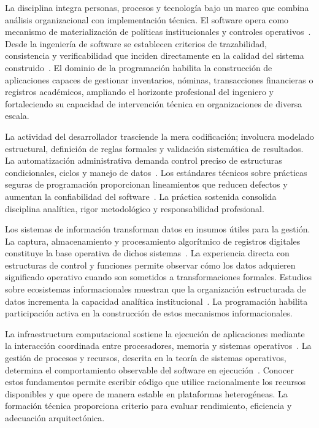 \documentclass[12pt,twoside]{book}
\begin{document}
			La disciplina integra personas, procesos y tecnología bajo un marco que combina análisis organizacional con implementación técnica. El software opera como mecanismo de materialización de políticas institucionales y controles operativos~\cite{Gonzalez-Longatt2007Introduccion}. Desde la ingeniería de software se establecen criterios de trazabilidad, consistencia y verificabilidad que inciden directamente en la calidad del sistema construido~\cite{Ghezzi2003Fundamentals}. El dominio de la programación habilita la construcción de aplicaciones capaces de gestionar inventarios, nóminas, transacciones financieras o registros académicos, ampliando el horizonte profesional del ingeniero y fortaleciendo su capacidad de intervención técnica en organizaciones de diversa escala.
			
			La actividad del desarrollador trasciende la mera codificación; involucra modelado estructural, definición de reglas formales y validación sistemática de resultados. La automatización administrativa demanda control preciso de estructuras condicionales, ciclos y manejo de datos~\cite{Hanly2015Problem}. Los estándares técnicos sobre prácticas seguras de programación proporcionan lineamientos que reducen defectos y aumentan la confiabilidad del software~\cite{ISO247722024Programming}. La práctica sostenida consolida disciplina analítica, rigor metodológico y responsabilidad profesional.
			
			Los sistemas de información transforman datos en insumos útiles para la gestión. La captura, almacenamiento y procesamiento algorítmico de registros digitales constituye la base operativa de dichos sistemas~\cite{Gaddis2022Starting}. La experiencia directa con estructuras de control y funciones permite observar cómo los datos adquieren significado operativo cuando son sometidos a transformaciones formales. Estudios sobre ecosistemas informacionales muestran que la organización estructurada de datos incrementa la capacidad analítica institucional~\cite{Calzati2025Ecosystemic}. La programación habilita participación activa en la construcción de estos mecanismos informacionales.
			
			La infraestructura computacional sostiene la ejecución de aplicaciones mediante la interacción coordinada entre procesadores, memoria y sistemas operativos~\cite{Stallings2021Computer}. La gestión de procesos y recursos, descrita en la teoría de sistemas operativos, determina el comportamiento observable del software en ejecución~\cite{Silberschatz2018Operating}. Conocer estos fundamentos permite escribir código que utilice racionalmente los recursos disponibles y que opere de manera estable en plataformas heterogéneas. La formación técnica proporciona criterio para evaluar rendimiento, eficiencia y adecuación arquitectónica.
			
\end{document}
